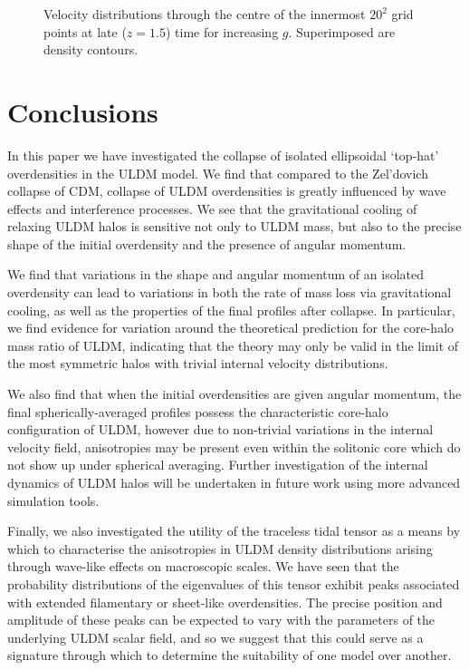 \documentclass[a4paper,11pt]{article}
\begin{document}
\begin{figure}[!htb]
\caption{Velocity distributions through the centre of the innermost $20^2$ grid points at late ($z = 1.5$) time for increasing $g$. Superimposed are density contours.}
\label{fig:vels_final_contours}
\end{figure}















\section{Conclusions}\label{sec:conclusion}

In this paper we have investigated the collapse of isolated ellipsoidal `top-hat' overdensities in the ULDM model. We find that compared to the Zel'dovich collapse of CDM, collapse of ULDM overdensities is greatly influenced by wave effects and interference processes. We see that the gravitational cooling of relaxing ULDM halos is sensitive not only to ULDM mass, but also to the precise shape of the initial overdensity and the presence of angular momentum. 

We find that variations in the shape and angular momentum of an isolated overdensity can lead to variations in both the rate of mass loss via gravitational cooling, as well as the properties of the final profiles after collapse. In particular, we find evidence for variation around the theoretical prediction for the core-halo mass ratio of ULDM, indicating that the theory may only be valid in the limit of the most symmetric halos with trivial internal velocity distributions. 

We also find that when the initial overdensities are given angular momentum, the final spherically-averaged profiles possess the characteristic core-halo configuration of ULDM, however due to non-trivial variations in the internal velocity field, anisotropies may be present even within the solitonic core which do not show up under spherical averaging. Further investigation of the internal dynamics of ULDM halos will be undertaken in future work using more advanced simulation tools. 

Finally, we also investigated the utility of the traceless tidal tensor as a means by which to characterise the anisotropies in ULDM density distributions arising through wave-like effects on macroscopic scales. We have seen that the probability distributions of the eigenvalues of this tensor exhibit peaks associated with extended filamentary or sheet-like overdensities. The precise position and amplitude of these peaks can be expected to vary with the parameters of the underlying ULDM scalar field, and so we suggest that this could serve as a signature through which to determine the suitability of one model over another. 
\end{document}
